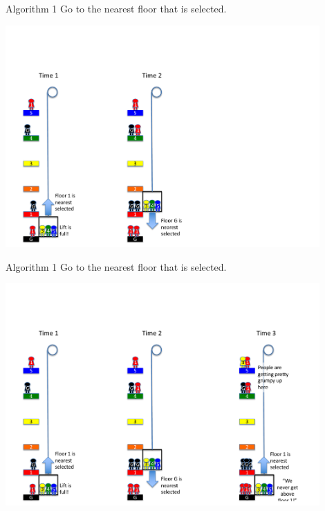 \documentclass{beamer} %
\begin{document}
\begin{frame}
  \vspace{-16mm}
  \begin{block}{Algorithm 1}
    Go to the nearest floor that is selected.
  \end{block}
  \centering
  \includegraphics[width=120mm, trim=0mm 0mm 0mm 50mm, clip=true]{img/lift2-anim2.pdf}

\end{frame}

\begin{frame}
  \vspace{-16mm}
  \begin{block}{Algorithm 1}
    Go to the nearest floor that is selected.
  \end{block}
  \centering
  \includegraphics[width=120mm, trim=0mm 0mm 0mm 50mm, clip=true]{img/lift2-anim3.pdf}

\end{frame}
\end{document}
